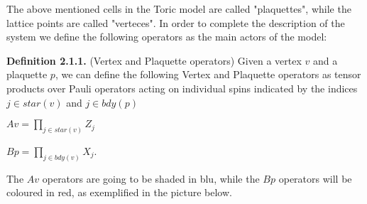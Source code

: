 \documentclass[12pt]{report}
\begin{document}
	
	\begin{minipage}{1\textwidth}
		
		The above mentioned cells in the Toric model are called "plaquettes", while the lattice points are called "verteces".
		In order to complete the description of the system we define the following operators as the main actors of the model:\newline
		
		\textbf{Definition 2.1.1.} (Vertex and Plaquette operators) Given a vertex $v$ and a plaquette $p$, we can define the following Vertex and Plaquette operators as tensor products over Pauli operators acting on individual spins indicated by the indices $j \in star(v)$ and $j \in bdy(p)$  \newline 
		
		\begin{center}
			$ Av = \prod_{j \in star(v)} Z_j $ \newline
			
			$ Bp = \prod_{j \in bdy(v)} X_j $.\newline
		\end{center}
		
		The $Av$ operators are going to be shaded in blu, while the $Bp$ operators will be coloured in red, as exemplified in the picture below. \newline
		
		\begin{center}
\end{center}
\end{minipage}
\end{document}
